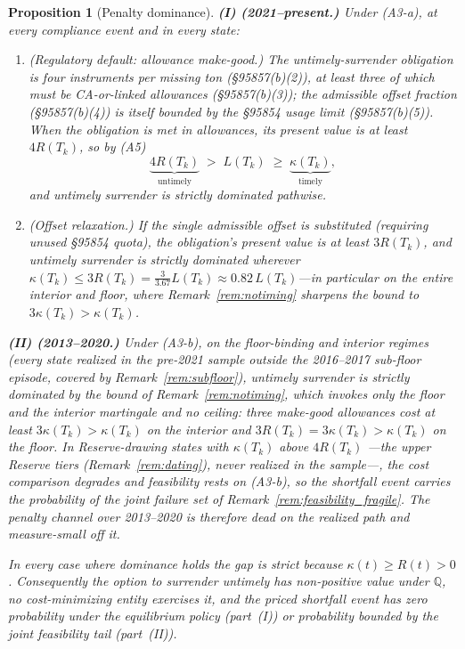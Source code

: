 \documentclass[11pt,letterpaper]{article}
\theoremstyle{plain}
\newtheorem{proposition}[theorem]{Proposition}
\theoremstyle{definition}
\newcommand{\Qmeasure}{\mathbb{Q}}           %
\numberwithin{equation}{section}
\begin{document}
\begin{proposition}[Penalty dominance]\label{prop:dom}
\textbf{(I) (2021--present.)} Under (A3-a), at every compliance event and in every state:
\begin{enumerate}
\item[(a)] \emph{(Regulatory default: allowance make-good.)} The untimely-surrender obligation is four instruments per missing ton (\S95857(b)(2)), at least three of which must be CA-or-linked allowances (\S95857(b)(3)); the admissible offset fraction (\S95857(b)(4)) is itself bounded by the \S95854 usage limit (\S95857(b)(5)). When the obligation is met in allowances, its present value is at least $4R(T_k)$, so by (A5)
\[
\underbrace{4R(T_k)}_{\text{untimely}}\;>\;L(T_k)\;\ge\;\underbrace{\kappa(T_k)}_{\text{timely}},
\]
and untimely surrender is strictly dominated pathwise.
\item[(b)] \emph{(Offset relaxation.)} If the single admissible offset is substituted (requiring unused \S95854 quota), the obligation's present value is at least $3R(T_k)$, and untimely surrender is strictly dominated wherever $\kappa(T_k)\le 3R(T_k)=\tfrac{3}{3.67}L(T_k)\approx 0.82\,L(T_k)$---in particular on the entire interior and floor, where Remark~\ref{rem:notiming} sharpens the bound to $3\kappa(T_k)>\kappa(T_k)$.
\end{enumerate}
\textbf{(II) (2013--2020.)} Under (A3-b), on the floor-binding and interior regimes (every state realized in the pre-2021 sample outside the 2016--2017 sub-floor episode, covered by Remark~\ref{rem:subfloor}), untimely surrender is strictly dominated by the bound of Remark~\ref{rem:notiming}, which invokes only the floor and the interior martingale and no ceiling: three make-good allowances cost at least $3\kappa(T_k)>\kappa(T_k)$ on the interior and $3R(T_k)=3\kappa(T_k)>\kappa(T_k)$ on the floor. In Reserve-drawing states with $\kappa(T_k)$ above $4R(T_k)$ ---the upper Reserve tiers (Remark~\ref{rem:dating}), never realized in the sample---, the cost comparison degrades and feasibility rests on (A3-b), so the shortfall event carries the probability of the joint failure set of Remark~\ref{rem:feasibility_fragile}. The penalty channel over 2013--2020 is therefore dead on the realized path and measure-small off it.

In every case where dominance holds the gap is strict because $\kappa(t)\ge R(t)>0$. Consequently the option to surrender untimely has non-positive value under $\Qmeasure$, no cost-minimizing entity exercises it, and the priced shortfall event has zero probability under the equilibrium policy (part~(I)) or probability bounded by the joint feasibility tail (part~(II)).
\end{proposition}
\end{document}
